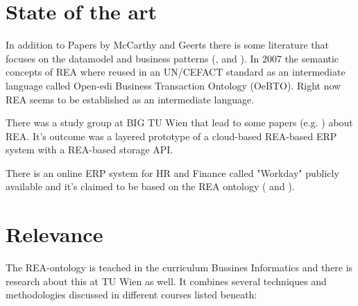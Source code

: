 %


\section{State of the art}

In addition to Papers by McCarthy and Geerts there is some literature that focuses on the datamodel and business patterns (\cite{dunn2005enterpriseinfosys}, \cite{hruby2006modeldrivendesign} and \cite{hollander2000accounting}).
In 2007 the semantic concepts of REA where reused in an UN/CEFACT standard \cite{ISOIEC1594442015} as an intermediate language called Open-edi Business Transaction Ontology (OeBTO).
Right now REA seems to be established as an intermediate language.  

There was a study group at BIG TU Wien that lead to some papers (e.g. \cite{wally2015modeldriven}) about REA.
It's outcome was a layered prototype of a cloud-based REA-based ERP system with a REA-based storage API.

There is an online ERP system for HR and Finance called "Workday" publicly available and it's claimed to be based on the REA ontology (\cite{nittler2012modernizeaccounting} and \cite{howlett2007workdayfinancials}).

%


\section{Relevance}

The REA-ontology is teached in the curriculum Bussines Informatics and there is research about this at TU Wien as well.
It combines several techniques and methodologies discussed in different courses listed beneath:


